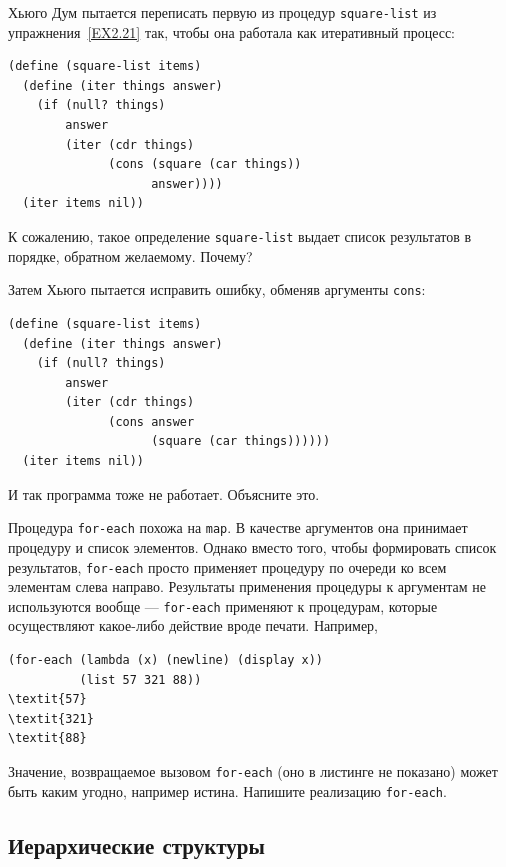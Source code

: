 \begin{exercise}{2.22}\label{EX2.22}%
Хьюго Дум пытается переписать первую из процедур
{\tt square-list} из упражнения~\ref{EX2.21} так,
чтобы она работала как итеративный процесс:

\begin{Verbatim}[fontsize=\small]
(define (square-list items)
  (define (iter things answer)
    (if (null? things)
        answer
        (iter (cdr things) 
              (cons (square (car things))
                    answer))))
  (iter items nil))
\end{Verbatim}
К сожалению, такое определение {\tt square-list} выдает список
результатов в порядке, обратном желаемому. Почему?

\noindent Затем Хьюго пытается исправить ошибку, обменяв аргументы
{\tt cons}:

\begin{Verbatim}[fontsize=\small]
(define (square-list items)
  (define (iter things answer)
    (if (null? things)
        answer
        (iter (cdr things)
              (cons answer
                    (square (car things))))))
  (iter items nil))
\end{Verbatim}
И так программа тоже не работает.  Объясните это.
\end{exercise}
\begin{exercise}{2.23}\label{EX2.23}%
Процедура {\tt for-each}
похожа на
{\tt map}.  В качестве аргументов она принимает процедуру и
список элементов.  Однако вместо того, чтобы формировать список
результатов, {\tt for-each} просто применяет процедуру по
очереди ко всем элементам слева направо.  Результаты применения
процедуры к аргументам не используются вообще  ---
{\tt for-each} применяют к процедурам, которые осуществляют 
какое-либо действие вроде печати. Например,

\begin{Verbatim}[fontsize=\small]
(for-each (lambda (x) (newline) (display x))
          (list 57 321 88))
\textit{57}
\textit{321}
\textit{88}
\end{Verbatim}
Значение, возвращаемое вызовом {\tt for-each} (оно в листинге
не показано) может быть каким угодно, например истина.  Напишите
реализацию {\tt for-each}.
\end{exercise}

\subsection{Иерархические структуры}
\label{HIERARCHICAL-STRUCTURES}


